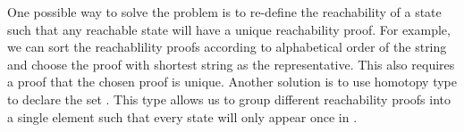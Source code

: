 \par One possible way to solve the problem is to re-define the
reachability of a state such that any reachable state will have a
unique reachability proof. For example, we can sort the reachablility
proofs according to alphabetical order of the string  and choose the proof
with shortest string as the representative. This also requires a proof that
the chosen proof is unique. Another solution is to use
homotopy type to declare the set . This type allows us to
group different reachability proofs into a single element such that
every state will only appear once in . 
